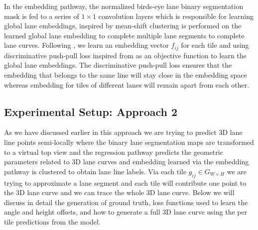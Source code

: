      In the embedding pathway, the normalized birds-eye lane binary segmentation mask is fed to a series of $1 \times 1$ convolution layers which is responsible for learning global lane embeddings, inspired by \cite{DBLP:journals/corr/abs-1802-05591} mean-shift clustering is performed on the learned global lane embedding to complete multiple lane segments to complete lane curves. Following \cite{DBLP:journals/corr/abs-2011-01535}, we learn an embedding vector $f_{ij}$ for each tile and using discriminative push-pull loss inspired from \cite{DBLP:journals/corr/abs-2011-01535} \cite{DBLP:journals/corr/abs-1802-05591} as an objective function to learn the global lane embeddings. The discriminative push-pull loss ensures that the embedding that belongs to the same line will stay close in the embedding space whereas embedding for tiles of different lanes will remain apart from each other. 

    \subsection{Experimental Setup: Approach 2}
    As we have discussed earlier in this approach we are trying to predict 3D lane line points semi-locally where the binary lane segmentation maps are transformed to a virtual top view and the regression pathway predicts the geometric parameters related to 3D lane curves and embedding learned via the embedding pathway is clustered to obtain lane line labels. Via each tile $g_{ij} \in G_{W \times H}$ we are trying to approximate a lane segment and each tile will contribute one point to the 3D lane curve and we can trace the whole 3D lane curve. Below we will discuss in detail the generation of ground truth, loss functions used to learn the angle and height offsets, and how to generate a full 3D lane curve using the per tile predictions from the model. 
